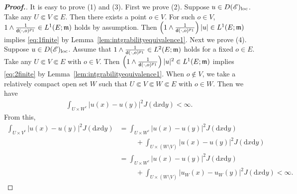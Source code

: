 \documentclass[12pt,a4paper]{article}
\renewcommand{\d}{\mathrm{d}}
\newcommand{\m}{\mathfrak{m} }
\newcommand{\loc}{{\rm loc}}
\newcommand{\1}{{\bf 1}}
\begin{document}
\begin{proof}[{\bf Proof.}]
It is easy to prove (1) and (3). First we prove (2). Suppose 
$u\in D(\mathscr{E})_{\loc}$. 
Take any $U\Subset V\Subset E$. Then there exists a point $o\in V$. 
For such $o\in V$, $1\land\frac{1}{{\sf d}(\cdot,o)^{p_1}}\in L^1(E;{\m})$ holds by assumption. Then  
$\left(1\land \frac{1}{{\sf d}(\cdot,o)^{p_1}} \right)|u|\in L^1(E;{\m})$ 
implies \eqref{eq:1finite} by Lemma~\ref{lem:intgrabilityequivalence1}. 
Next we prove (4). Suppose 
$u\in D(\mathscr{E})_{\loc}$. 
Assume that $1\land\frac{1}{{\sf d}(\cdot,o)^{p_1}}\in L^2(E;{\m})$ holds for a fixed $o\in E$. 
Take any $U\Subset V\Subset E$ with $o\in V$. 
Then $\left(1\land \frac{1}{{\sf d}(\cdot,o)^{p_1}} \right)|u|^2
\in L^1(E;{\m})$ 
implies \eqref{eq:2finite} by Lemma~\ref{lem:intgrabilityequivalence1}. 
When $o\notin V$, we take a relatively compact open set $W$ such that  $U\Subset V\Subset W\Subset E$ with $o\in W$. Then we have 
\begin{align*}
\int_{U\times W^c}|u(x)-u(y)|^2J({\d} x{\d} y)<\infty.
\end{align*}
From this, 
\begin{align*}
\int_{U\times V^c}|u(x)-u(y)|^2J({\d} x{\d} y)&=
\int_{U\times W^c}|u(x)-u(y)|^2J({\d} x{\d} y)\\
&\hspace{1cm}+
\int_{U\times (W\setminus V)}|u(x)-u(y)|^2J({\d} x{\d} y)\\
&=
\int_{U\times W^c}|u(x)-u(y)|^2J({\d} x{\d} y)\\
&\hspace{1cm}+
\int_{U\times (W\setminus V)}|u_W(x)-u_W(y)|^2J({\d} x{\d} y)<\infty.
\end{align*}
\end{proof}
\end{document}
